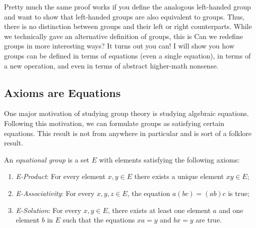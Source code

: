 \documentclass{article}
\begin{document}
Pretty much the same proof works if you define the analogous left-handed group and want to show that left-handed groups are also equivalent to groups.
Thus, there is no distinction between groups and their left or right counterparts.
While we technically gave an alternative definition of groups, this is
Can we redefine groups in more interesting ways?
It turns out you can!
I will show you how groups can be defined in terms of equations (even a single equation), in terms of a new operation, and even in terms of abstract higher-math nonsense.

\subsection*{Axioms are Equations}

One major motivation of studying group theory is studying algebraic equations.
Following this motivation, we can formulate groups as satisfying certain equations.
This result is not from anywhere in particular and is sort of a folklore result.
\begin{defn}\label{defn:eq-grp}
  An \emph{equational group} is a set $E$ with elements satisfying the following axioms:
  \begin{enumerate}
  \item \emph{E-Product}: For every element $x, y \in E$ there exists a unique element $xy \in E$;
  \item \emph{E-Associativity}: For every $x, y, z \in E$, the equation $a(bc) = (ab)c$ is true;
  \item \emph{E-Solution}: For every $x, y \in E$, there exists at least one element $a$ and one element $b$ in $E$ such that the equations $xa = y$ and $bx = y$ are true.
  \end{enumerate}
\end{defn}
\end{document}
